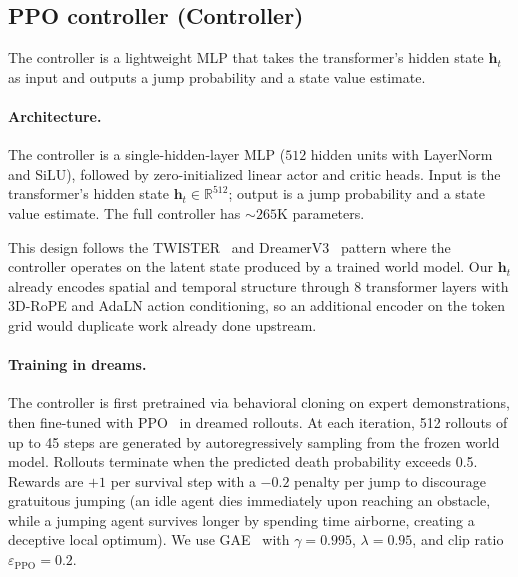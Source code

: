 \documentclass{article}
\newcommand{\hdim}{512}
\newcommand{\nlayers}{8}
\newcommand{\ctrlparams}{\sim\!265\text{K}}
\begin{document}
\subsection{PPO controller (Controller)}
\label{sec:controller}

The controller is a lightweight MLP that takes the transformer's hidden state $\mathbf{h}_t$ as input and outputs a jump probability and a state value estimate.

\paragraph{Architecture.}
The controller is a single-hidden-layer MLP ($\hdim$ hidden units with LayerNorm and SiLU), followed by zero-initialized linear actor and critic heads. Input is the transformer's hidden state $\mathbf{h}_t \in \mathbb{R}^{\hdim}$; output is a jump probability and a state value estimate. The full controller has $\ctrlparams$ parameters.

This design follows the TWISTER~\citep{burchi2025twister} and DreamerV3~\citep{hafner2025dreamerv3} pattern where the controller operates on the latent state produced by a trained world model. Our $\mathbf{h}_t$ already encodes spatial and temporal structure through \nlayers{} transformer layers with 3D-RoPE and AdaLN action conditioning, so an additional encoder on the token grid would duplicate work already done upstream.

\paragraph{Training in dreams.}
The controller is first pretrained via behavioral cloning on expert demonstrations, then fine-tuned with PPO~\citep{schulman2017ppo} in dreamed rollouts.
At each iteration, 512 rollouts of up to 45 steps are generated by autoregressively sampling from the frozen world model.
Rollouts terminate when the predicted death probability exceeds 0.5.
Rewards are $+1$ per survival step with a $-0.2$ penalty per jump to discourage gratuitous jumping (an idle agent dies immediately upon reaching an obstacle, while a jumping agent survives longer by spending time airborne, creating a deceptive local optimum).
We use GAE~\citep{schulman2017ppo} with $\gamma = 0.995$, $\lambda = 0.95$, and clip ratio $\varepsilon_\text{PPO} = 0.2$.
\end{document}
